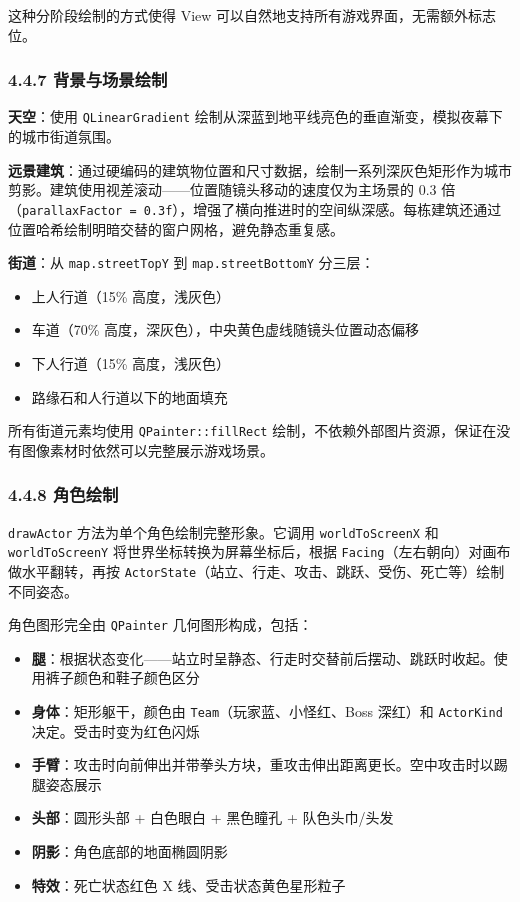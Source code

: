 \documentclass[12pt,fontset=none]{ctexart}
\begin{document}
这种分阶段绘制的方式使得 View 可以自然地支持所有游戏界面，无需额外标志位。

\subsubsection{4.4.7 背景与场景绘制}

\textbf{天空}：使用 \texttt{QLinearGradient} 绘制从深蓝到地平线亮色的垂直渐变，模拟夜幕下的城市街道氛围。

\textbf{远景建筑}：通过硬编码的建筑物位置和尺寸数据，绘制一系列深灰色矩形作为城市剪影。建筑使用视差滚动——位置随镜头移动的速度仅为主场景的 0.3 倍（\texttt{parallaxFactor = 0.3f}），增强了横向推进时的空间纵深感。每栋建筑还通过位置哈希绘制明暗交替的窗户网格，避免静态重复感。

\textbf{街道}：从 \texttt{map.streetTopY} 到 \texttt{map.streetBottomY} 分三层：
\begin{itemize}
\item 上人行道（15\% 高度，浅灰色）
\item 车道（70\% 高度，深灰色），中央黄色虚线随镜头位置动态偏移
\item 下人行道（15\% 高度，浅灰色）
\item 路缘石和人行道以下的地面填充
\end{itemize}

所有街道元素均使用 \texttt{QPainter::fillRect} 绘制，不依赖外部图片资源，保证在没有图像素材时依然可以完整展示游戏场景。

\subsubsection{4.4.8 角色绘制}

\texttt{drawActor} 方法为单个角色绘制完整形象。它调用 \texttt{worldToScreenX} 和 \texttt{worldToScreenY} 将世界坐标转换为屏幕坐标后，根据 \texttt{Facing}（左右朝向）对画布做水平翻转，再按 \texttt{ActorState}（站立、行走、攻击、跳跃、受伤、死亡等）绘制不同姿态。

角色图形完全由 \texttt{QPainter} 几何图形构成，包括：

\begin{itemize}
\item \textbf{腿}：根据状态变化——站立时呈静态、行走时交替前后摆动、跳跃时收起。使用裤子颜色和鞋子颜色区分
\item \textbf{身体}：矩形躯干，颜色由 \texttt{Team}（玩家蓝、小怪红、Boss 深红）和 \texttt{ActorKind} 决定。受击时变为红色闪烁
\item \textbf{手臂}：攻击时向前伸出并带拳头方块，重攻击伸出距离更长。空中攻击时以踢腿姿态展示
\item \textbf{头部}：圆形头部 + 白色眼白 + 黑色瞳孔 + 队色头巾/头发
\item \textbf{阴影}：角色底部的地面椭圆阴影
\item \textbf{特效}：死亡状态红色 X 线、受击状态黄色星形粒子
\end{itemize}
\end{document}
